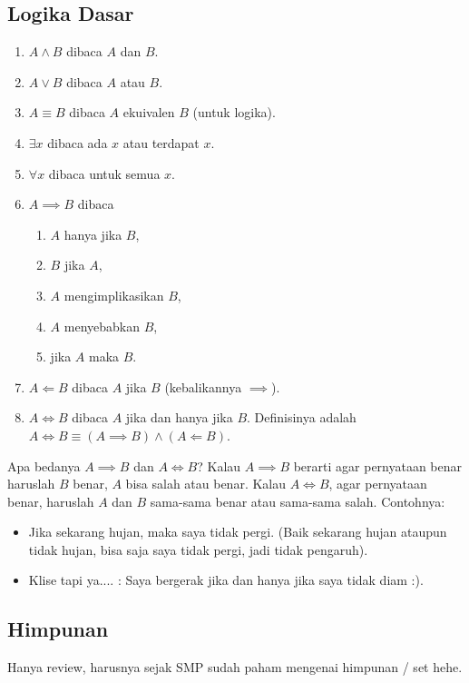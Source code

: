 \documentclass[11pt]{scrartcl}
\begin{document}
	\subsection{Logika Dasar}
	\begin{enumerate}
	    \item $A \land B$ dibaca $A$ dan $B$.
	    \item $A \lor B$ dibaca $A$ atau $B$.
	    \item $A \equiv B$ dibaca $A$ ekuivalen $B$ (untuk logika).
	    \item $\exists x$ dibaca ada $x$ atau terdapat $x$.
	    \item $\forall x$ dibaca untuk semua $x$.
	    \item $A \implies B$ dibaca
	    \begin{enumerate}
	        \item $A$ hanya jika $B$,
	        \item $B$ jika $A$,
	        \item $A$ mengimplikasikan $B$,
	        \item $A$ menyebabkan $B$,
	        \item jika $A$ maka $B$.
	    \end{enumerate}
	    \item $A \Longleftarrow B$ dibaca $A$ jika $B$ (kebalikannya $\implies$).
	    \item $A \iff B$ dibaca $A$ jika dan hanya jika $B$. Definisinya adalah $A \iff B \equiv (A \implies B) \land (A \Longleftarrow B)$.
	\end{enumerate}
	Apa bedanya $A \implies B$ dan $A \iff B$? Kalau $A \implies B$ berarti agar pernyataan benar haruslah $B$ benar, $A$ bisa salah atau benar. Kalau $A \iff B$, agar pernyataan benar, haruslah $A$ dan $B$ sama-sama benar atau sama-sama salah. Contohnya:
	\begin{itemize}
	    \item Jika sekarang hujan, maka saya tidak pergi. (Baik sekarang hujan ataupun tidak hujan, bisa saja saya tidak pergi, jadi tidak pengaruh).
	    \item Klise tapi ya.... : Saya bergerak jika dan hanya jika saya tidak diam :).
	\end{itemize}
	\subsection{Himpunan}
	Hanya review, harusnya sejak SMP sudah paham mengenai himpunan / set hehe.
	
\end{document}
